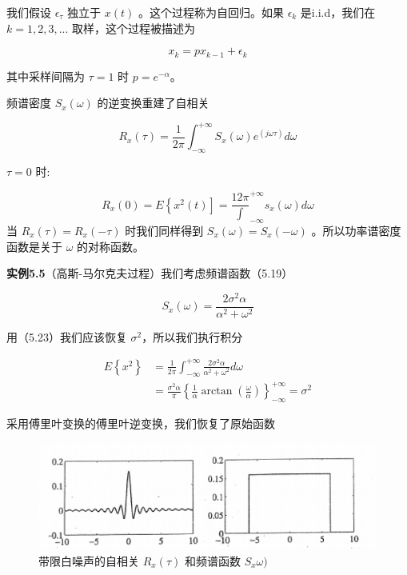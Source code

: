 	      我们假设 $ \epsilon_{\tau} $ 独立于 $ x(t) $ 。这个过程称为自回归。如果  $ \epsilon_{k}  $ 是i.i.d，我们在 $ k = 1, 2, 3,... $ 取样，这个过程被描述为 
	      
	     \begin{equation}\label{5.21}
	    x_{k}=px_{k-1} +\epsilon_{k}
	    \end{equation}
	     
	     其中采样间隔为 $ \tau=1 $ 时 $ p=e^{-\alpha} $。
	     
	     频谱密度 $ S_{x}(\omega) $  的逆变换重建了自相关
	     
	    	\begin{equation}\label{5.22}
	    R_{x}(\tau)=\frac{1}{2\pi}\int_{-\infty}^{+\infty}S_{x}(\omega)e^(j\omega\tau)d\omega
	    \end{equation}
	     
	     $ \tau=0 $ 时:
	     
	     \begin{equation}\label{5.23}
	     R_{x}(0)=E\left\lbrace x^{2}(t) \right] =\frac{{1}{2\pi}}\int_{-\infty}^{+\infty} s_{x}(\omega)d\omega
	     \end{equation}
	     当 $ R_{x}(\tau)=R_{x}(-\tau) $ 时我们同样得到 $ S_{x}(\omega)=S_{x}(-\omega) $ 。所以功率谱密度函数是关于 $ \omega $  的对称函数。
	    
	     \textbf{实例5.5}（高斯-马尔克夫过程）我们考虑频谱函数（5.19）
	     
	     \[ S_{x}(\omega)=\frac{2\sigma^{2}\alpha}{\alpha^{2}+\omega^{2}} \]	
	     
	     用（5.23）我们应该恢复  $ \sigma^{2} $，所以我们执行积分
	     	
	   	\begin{equation*}
	   \begin{aligned}
	   E\left\lbrace x^{2}\right\rbrace&=\frac{1}{2\pi}\int_{-\infty}^{+\infty}\frac{2\sigma^{2}\alpha}{\alpha^{2}+\omega^{2}}d\omega \\
	   &= \frac{\sigma^{2}\alpha}{\pi}\left\lbrace \frac{1}{\alpha}\arctan(\frac{\omega}{\alpha}) \right\rbrace_{-\infty}^{+\infty} =\sigma^{2}
	   \end{aligned}
	   \end{equation*}
	     
	     采用傅里叶变换的傅里叶逆变换，我们恢复了原始函数
	     
	   	\begin{figure}[h]
	   	\centering
	   	\includegraphics[width=0.7\linewidth]{TeX_files/Part02/chapter05/image/2}
	   	\caption{ 带限白噪声的自相关 $ R_{x}(\tau) $ 和频谱函数 $ S_{x}\omega) $}
	   \end{figure}
	     
